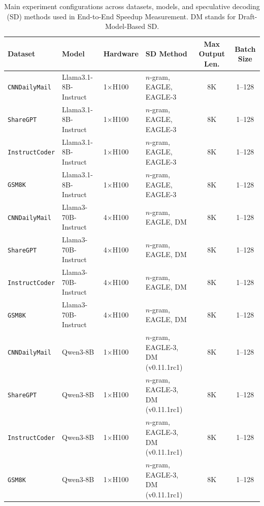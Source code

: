 \begin{table}[t!]
\centering
\caption{Main experiment configurations across datasets, models, and speculative decoding (SD) methods used in End-to-End Speedup Measurement. DM stands for Draft-Model-Based SD.}
\label{tab:exp-config}
\setlength{\tabcolsep}{2.5pt}
\renewcommand{\arraystretch}{1.1}
\begin{tabular}{l l l l c c}
\toprule
\textbf{Dataset} & \textbf{Model} & \textbf{Hardware} & \textbf{SD Method} & \textbf{Max Output Len.} & \textbf{Batch Size}\\
\midrule
\texttt{CNNDailyMail} & Llama3.1-8B-Instruct & 1$\times$H100 & $n$-gram, EAGLE, EAGLE-3  & 8K & 1–128 \\
\texttt{ShareGPT}     & Llama3.1-8B-Instruct & 1$\times$H100 & $n$-gram, EAGLE, EAGLE-3  & 8K & 1–128 \\
\texttt{InstructCoder}& Llama3.1-8B-Instruct & 1$\times$H100 & $n$-gram, EAGLE, EAGLE-3  & 8K & 1–128 \\
\texttt{GSM8K}        & Llama3.1-8B-Instruct & 1$\times$H100 & $n$-gram, EAGLE, EAGLE-3  & 8K & 1–128 \\
\midrule
\texttt{CNNDailyMail} & Llama3-70B-Instruct  & 4$\times$H100 & $n$-gram, EAGLE, DM       & 8K & 1–128 \\
\texttt{ShareGPT}     & Llama3-70B-Instruct  & 4$\times$H100 & $n$-gram, EAGLE, DM         & 8K & 1–128 \\
\texttt{InstructCoder}& Llama3-70B-Instruct  & 4$\times$H100 & $n$-gram, EAGLE, DM         & 8K & 1–128 \\
\texttt{GSM8K}        & Llama3-70B-Instruct  & 4$\times$H100 & $n$-gram, EAGLE, DM         & 8K & 1–128 \\
\midrule
\texttt{CNNDailyMail} & Qwen3-8B    & 1$\times$H100 & $n$-gram, EAGLE-3, DM (v0.11.1rc1)         & 8K  & 1–128 \\
\texttt{ShareGPT}     & Qwen3-8B    & 1$\times$H100 & $n$-gram, EAGLE-3, DM (v0.11.1rc1)       & 8K  & 1–128 \\
\texttt{InstructCoder}& Qwen3-8B    & 1$\times$H100 & $n$-gram, EAGLE-3, DM (v0.11.1rc1)     & 8K  & 1–128 \\
\texttt{GSM8K}        & Qwen3-8B    & 1$\times$H100 & $n$-gram, EAGLE-3, DM (v0.11.1rc1)     & 8K  & 1–128 \\
\midrule

\end{tabular}
\end{table}
